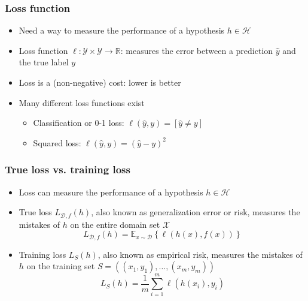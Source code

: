 \documentclass[10pt]{beamer}
\begin{document}
\begin{frame}
  \frametitle{Loss function}
  \begin{itemize}
	\item Need a way to measure the {\color{green} performance} of a hypothesis $h\in\mathcal{H}$
	\item {\color{blue} Loss function} $\ell:\mathcal{Y}\times\mathcal{Y}\rightarrow \mathbb{R}$: measures the {\color{red} error} between a prediction $\hat{y}$ and the true label $y$
	\item Loss is a (non-negative) {\color{orange} cost}: lower is better
	\item Many different loss functions exist
	\begin{itemize}
	\item Classification or 0-1 loss: $\ell(\hat{y},y)=[\hat{y} \neq y]$
	\item Squared loss: $\ell(\hat{y},y) = (\hat{y} - y)^2$
	\end{itemize}
  \end{itemize}
\end{frame}

\begin{frame}
  \frametitle{True loss vs. training loss}
  \begin{itemize}
	\item Loss can measure the {\color{green} performance} of a hypothesis $h\in\mathcal{H}$
	\item {\color{orange} True loss} $L_{\mathcal{D},f}(h)$, also known as {\color{orange} generalization error} or {\color{orange} risk}, measures the mistakes of $h$ on the entire {\color{blue} domain set $\mathcal{X}$}
	\[
	L_{\mathcal{D},f}(h) = \mathbb{E}_{x\sim\mathcal{D}} \left\{ \ell(h(x),f(x)) \right\}
	\]
	\item {\color{red} Training loss} $L_S(h)$, also known as {\color{red} empirical risk}, measures the mistakes of $h$ on the {\color{cyan} training set $S=((x_1,y_1),\ldots,(x_m,y_m))$}
	\[
	L_S(h) = \frac 1 m \sum_{i=1}^m \ell(h(x_i),y_i)
	\]
  \end{itemize}
\end{frame}
\end{document}

